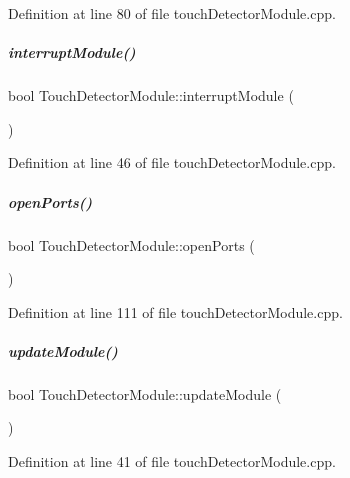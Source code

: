 Definition at line 80 of file touch\+Detector\+Module.\+cpp.

\mbox{\label{group__touchDetector_a76c20d89ce3e6b39b17ea7d0d8f37f0b}} 
\subparagraph{\texorpdfstring{interrupt\+Module()}{interruptModule()}}
{\footnotesize\ttfamily bool Touch\+Detector\+Module\+::interrupt\+Module (\begin{DoxyParamCaption}{ }\end{DoxyParamCaption})}



Definition at line 46 of file touch\+Detector\+Module.\+cpp.

\mbox{\label{group__touchDetector_a3d6655dced4f57eb35e80a20afe6036b}} 
\subparagraph{\texorpdfstring{open\+Ports()}{openPorts()}}
{\footnotesize\ttfamily bool Touch\+Detector\+Module\+::open\+Ports (\begin{DoxyParamCaption}{ }\end{DoxyParamCaption})\hspace{0.3cm}{\ttfamily [protected]}}



Definition at line 111 of file touch\+Detector\+Module.\+cpp.

\mbox{\label{group__touchDetector_af4e0e9b987ca4acc22f28120e8dc2ad5}} 
\subparagraph{\texorpdfstring{update\+Module()}{updateModule()}}
{\footnotesize\ttfamily bool Touch\+Detector\+Module\+::update\+Module (\begin{DoxyParamCaption}{ }\end{DoxyParamCaption})}



Definition at line 41 of file touch\+Detector\+Module.\+cpp.



